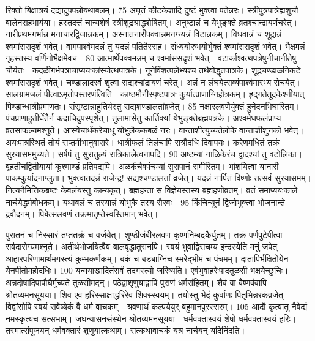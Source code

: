 रिक्तो बिक्षात्रयं दद्यादुपपन्नोयथाबलम्।
 75 अघृतं कीटकेशादि दुष्टं भुक्त्वा पतेन्नरः।
 स्त्रीपुत्रपात्रेह्यशुचौ बालेनसहभार्यया।
 हस्तदत्तं चान्यशेषं स्त्रीशूद्रश्राद्धशेषितम्।
 अनुष्टान्नं च येभुङ्क्ते व्रतश्चान्द्रायणंचरेत्।
 नारीप्रथमगर्भान्न मनाचारद्विजान्नकम्।
 अस्नातनारीपक्वान्नमनग्न्यन्नं विटान्नकम्।
 विधवान्नं च शूद्रान्नं श्वमांससदृशं भवेत्।
 वामपार्श्वमदन्नं तु यदन्नं पतितैस्सह।
 संध्ययोरुभयोर्भुक्तं श्वमांससदृशं भवेत्।
 भैक्षमन्नं गृहस्तस्य वर्णिनोभैक्षमेवच।
 80 आत्मार्थेपक्वमन्नम् च श्वमांससदृशं भवेत्।
 वटार्काश्वत्थपत्रेषुनीचानीतेषु चौर्यतः।
 कदळीगर्भपत्राचाप्ययःकांस्योत्थपात्रके।
 नूनेविंशत्पलेभ्यश्च तथैवोद्धृतपात्रके।
 शूद्रचण्डाळनिकटे श्वमांससदृशं भवेत्।
 चण्डालादरवं शृत्वा सद्यश्चांद्रायणं चरेत्।
 अन्नं न लंघयेत्सव्यंपार्श्वमारभ्य सेचयेत्।
 सालग्रामजलं पीत्वाऽमृतोपस्तरणंत्विति।
 काष्ठमौनीस्पृष्टपात्रः कुर्यात्प्राणाग्निहोत्रकम्।
 हृद्गतेतूदकेश्नीयात् पिण्डान्धात्रीप्रमाणतः।
 संसृष्टान्नाहुतिर्यस्तु सद्यशण्डालतांव्रजेत्।
 85
नक्षारलवणैर्युक्तं हुनेदनभिघारितम्।
 पंचप्राणाहुतीर्धेतैर्न कदाचिदुपस्पृशेत्।
 तुलामासेतु कार्तिक्यां येभुङ्क्तेब्रह्मपत्रके।
 अश्वमेधफलंप्राप्य व्रतसाफल्यमश्नुते।
 आस्येचार्धंकरेचाधू योभुलैककबळं नरः।
 वान्ताशीत्युच्यतेलोके वान्ताशीशुनको भवेत्।
 अयःपात्रस्थितं तोयं सप्तमीभानुवासरे।
 धात्रीफलं तिलंचापि रात्रौदधि दिवापयः।
 करेणमधितं तक्रं सुरयासममुच्यते।
 सर्षपं तु सुरातुल्यं रात्रिकालेत्वनापदि।
 90 अष्टम्यां नाळिकेरंच द्वादश्यां तु वटोलिका।
 बृहतीचद्वितीयायां कूश्माण्डं प्रतिपद्यपि।
 अळर्कंचैवपंचम्यां सुरापानं समीरितम्।
 भांशयित्वा यानारी पाकम्कुर्यादनाप्लुता।
 भुक्त्वातदन्नं राजेन्द्र! सद्यश्चण्डालतां व्रजेत्।
 यदन्नं नार्पितं विष्णोः तत्सर्वं सुरयासमम्।
 नित्यनैमित्तिकब्रष्टः केवलंयस्तु काम्यकृत्।
 ब्रह्महन्ता स विज्ञेयस्तस्य ब्रह्महणोव्रतम्।
 व्रतं समाप्ययःकाले नार्चयेद्धर्मबोधकम्।
 यथाबलं च तस्यान्नं योभुकै तस्य रौरवः।
 95 किंचिन्यूनं द्विजोभुक्त्वा भोजनान्ते द्रवौदनम्।
 पिबेत्सलवणं तक्रमातृप्तेस्वस्तिमान् भवेत्।
 
पुरातनं च निस्सारं तप्ततक्रं च वर्जयेत्।
 शुण्ठीजंबीरलवण कृष्णनिम्बदकैर्युतम्।
 तक्रं पर्णपुटेपीत्वा सर्वदारोग्यमश्नुते।
 अतीर्थभोजयित्वैव बालवृद्धातुरानपि।
 स्वयं भुवाद्विराचम्य इन्द्रस्येति मनुं जपेत्।
 आहारपरिणामार्थमगस्त्यं कुम्भकर्णकम्।
 बकं च बडबाग्निंच स्मरेद्भीमं च पंचमम्।
 दातापिर्भक्षितोयेन येनपीतोमहोदधिः।
 100 यन्मयाखादितंसर्वं तदगस्त्यो जरिष्यति।
 एवंभुवाहरेःपादतुळसी भक्षयेच्छुचिः।
 अन्नदोषादिपापौघैर्मुच्यते तुळसीमदन्।
 पठेद्वाशृणुयाद्वापि पुराणं धर्मसंहितम्।
 शैवं वा वैष्णवंवापि श्रोतव्यमनसूयया।
 शिव एव हरिस्साक्षाद्धरिरेव शिवस्स्वयम्।
 तयोस्तु भेदं कुर्वाणः पितृभिन्नरकंव्रजेत्।
 विद्वांसोपि स्वयं सर्वेष्येकं वै धर्म वाचकम्।
 श्रवणार्थं कल्पयेयुर् बहुमानपुरस्सरम्।
 105 आदौ कृत्वातु नैवेद्यं नमस्कृत्यच सत्सभाम्।
 जघन्यासनसंस्थेन श्रोतव्यमनसूयया।
 धर्मवक्तास्वयं शेषो धर्मवक्तास्वयं हरिः।
 तस्मात्संपूजयन् धर्मवक्तारं शृणुयात्कथाम्।
 सत्कथावाचकं यत्र नार्चयन् यदिनिंदति।
 
